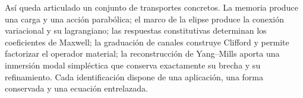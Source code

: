 Así queda articulado un conjunto de transportes concretos. La memoria
produce una carga y una acción parabólica; el marco de la elipse produce
la conexión variacional y su lagrangiano; las respuestas constitutivas
determinan los coeficientes de Maxwell; la graduación de canales construye
Clifford y permite factorizar el operador material; la reconstrucción de
Yang--Mills aporta una inmersión modal simpléctica que conserva exactamente
su brecha y su refinamiento. Cada identificación dispone de una aplicación,
una forma conservada y una ecuación entrelazada.
